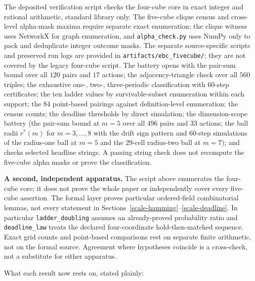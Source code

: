\documentclass[10pt,twocolumn]{article}
\theoremstyle{plain}
\theoremstyle{definition}
\theoremstyle{remark}
\begin{document}
The deposited verification script checks the four-cube core in exact
integer and rational arithmetic, standard library only. The five-cube
clique census and cross-level alpha-mask maxima require separate exact
enumeration; the clique witness uses NetworkX for graph enumeration,
and \texttt{alpha\_check.py} uses NumPy only to pack and deduplicate
integer outcome masks. The separate source-specific scripts and preserved run logs are provided in \texttt{artifacts/ebc\_fivecube/}; they are not covered by the legacy four-cube script. The battery opens with the pair-sum bound over all \(120\) pairs and \(17\) actions; the
adjacency-triangle check over all \(560\) triples; the exhaustive
one-, two-, three-periodic classification with \(60\)-step
certificates; the ten ladder values by survivable-subset enumeration
within each support; the \(84\) point-based pairings against
definition-level enumeration; the census counts; the deadline
thresholds by direct simulation; the dimension-scope battery (the
pair-sum bound at \(m = 5\) over all \(496\) pairs and \(33\)
actions; the ball radii \(r^{*}(m)\) for \(m = 3, \dots, 8\) with
the drift sign pattern and \(60\)-step simulations of the radius-one
ball at \(m = 5\) and the \(29\)-cell radius-two ball at
\(m = 7\)); and checks selected headline strings. A passing string check does not recompute
the five-cube alpha masks or prove the classification.

\textbf{A second, independent apparatus.} The script above enumerates the four-cube core; it does not prove
the whole paper or independently cover every five-cube assertion. The formal layer proves particular ordered-field combinatorial
lemmas, not every statement in Sections~\ref{scale-hamming}--\ref{scale-deadline}.
In particular \texttt{ladder\_doubling} assumes an already-proved
probability ratio and \texttt{deadline\_law} treats the declared
four-coordinate hold-then-matched sequence. Exact grid counts and
point-based comparisons rest on separate finite arithmetic, not on
the formal source. Agreement where hypotheses coincide is a
cross-check, not a substitute for either apparatus.

What each result now rests on, stated plainly:
\end{document}
